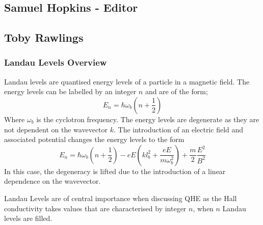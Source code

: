 \documentclass[12pt]{article}
\newcommand{\PRLsep}{\noindent\makebox[\linewidth]{\resizebox{0.3333\linewidth}{1pt}{$\bullet$}}\bigskip}
\begin{document}
\vspace{0.5cm}
\PRLsep

\subsection*{Samuel Hopkins - Editor}


\newpage
\subsection*{Toby Rawlings}

\subsubsection*{Landau Levels Overview}

Landau levels are quantised energy levels of a particle in a magnetic field. The energy levels can be labelled by an integer $n$ and are of the form;
\begin{equation*}
    E_n = \hbar \omega_{b}\left(n + \frac{1}{2}\right)
\end{equation*}
Where $\omega_{b}$ is the cyclotron frequency. The energy levels are degenerate as they are not dependent on the wavevector $k$. The introduction of an electric
field and associated potential changes the energy levels to the form
\begin{equation*}
    E_n = \hbar \omega_{b}\left(n + \frac{1}{2}\right) - eE\left(k l_b^2 + \frac{eE}{m\omega_{b}^2}\right) + \frac{m}{2}\frac{E^2}{B^2}
\end{equation*}
In this case, the degeneracy is lifted due to the introduction of a linear dependence on the wavevector.

\noindent Landau Levels are of central importance when discussing QHE as the Hall conductivity takes values that are characterised by integer $n$, when $n$ Landau levels are filled.
\end{document}
